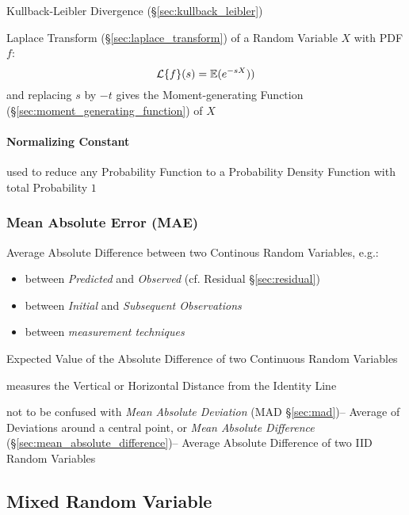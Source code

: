 \fist Kullback-Leibler Divergence (\S\ref{sec:kullback_leibler})

Laplace Transform (\S\ref{sec:laplace_transform}) of a Random Variable $X$ with
PDF $f$:
\[
  \mathcal{L}\{f\}(s) = \mathbb{E}(e^{-sX}))
\]
and replacing $s$ by $-t$ gives the Moment-generating Function
(\S\ref{sec:moment_generating_function}) of $X$



\paragraph{Normalizing Constant}\label{sec:normalizing_constant}\hfill

used to reduce any Probability Function to a Probability Density Function with
total Probability $1$




\subsubsection{Mean Absolute Error (MAE)}\label{sec:mae}

Average Absolute Difference between two Continous Random Variables, e.g.:
\begin{itemize}
  \item between \emph{Predicted} and \emph{Observed} (cf. Residual
    \S\ref{sec:residual})
  \item between \emph{Initial} and \emph{Subsequent Observations}
  \item between \emph{measurement techniques}
\end{itemize}

Expected Value of the Absolute Difference of two Continuous Random Variables

measures the Vertical or Horizontal Distance from the Identity Line

\fist not to be confused with \emph{Mean Absolute Deviation} (MAD
\S\ref{sec:mad})-- Average of Deviations around a central point, or \emph{Mean
  Absolute Difference} (\S\ref{sec:mean_absolute_difference})-- Average Absolute
Difference of two IID Random Variables



\subsection{Mixed Random Variable}\label{sec:mixed_random_variable}

